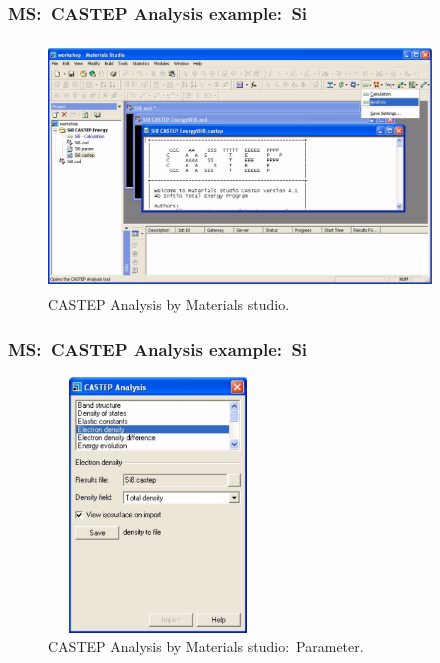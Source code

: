 \frame
{
	\frametitle{\textrm{MS:~CASTEP Analysis example:~Si}}
\begin{figure}[h!]
\centering
\vspace*{-0.10in}
\includegraphics[height=2.60in,width=4.00in,viewport=0 0 1210 742,clip]{Figures/MS-CASTEP-09-Si-Analysis.png}
\caption{\tiny \textrm{CASTEP Analysis by Materials studio.}}%
\label{MS-CASTEP-Analysis}
\end{figure}
}

\frame
{
	\frametitle{\textrm{MS:~CASTEP Analysis example:~Si}}
\begin{figure}[h!]
\centering
\vspace*{-0.10in}
\includegraphics[height=2.66in,width=2.30in,viewport=0 0 567 813,clip]{Figures/MS-CASTEP-10-Si-Analysis-parameter.png}
\caption{\tiny \textrm{CASTEP Analysis by Materials studio:~Parameter.}}%
\label{MS-CASTEP-Analysis-parameter}
\end{figure}
}

